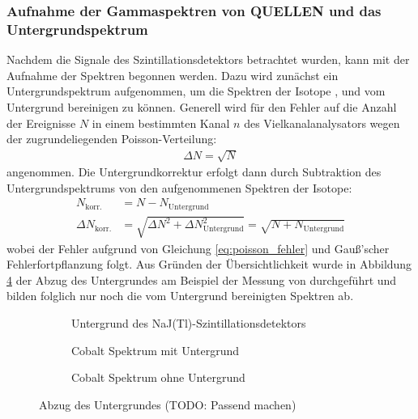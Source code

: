 \documentclass[11pt, a4paper]{article}
\numberwithin{equation}{section}
\begin{document}
\subsubsection{Aufnahme der Gammaspektren von QUELLEN und das Untergrundspektrum}
Nachdem die Signale des Szintillationsdetektors betrachtet wurden, kann mit der Aufnahme der Spektren begonnen werden.
Dazu wird zunächst ein Untergrundspektrum aufgenommen, um die Spektren der Isotope ,  und  vom Untergrund bereinigen zu können.
Generell wird für den Fehler auf die Anzahl der Ereignisse $N$ in einem bestimmten Kanal $n$ des Vielkanalanalysators wegen der zugrundeliegenden Poisson-Verteilung:
\begin{align}
\label{eq:poisson_fehler}
\Delta N = \sqrt{N}
\end{align}
angenommen.
Die Untergrundkorrektur erfolgt dann durch Subtraktion des Untergrundspektrums von den aufgenommenen Spektren der Isotope:
\begin{align}
	\label{eq:untergrundkorr_fehler}
	N_\mathrm{korr.} &= N - N_\mathrm{Untergrund}  \nonumber\\
	\Delta N_\mathrm{korr.} &= \sqrt{\Delta N^2 + \Delta N_\mathrm{Untergrund}^2} = \sqrt{N + N_\mathrm{Untergrund}}
\end{align}
wobei der Fehler aufgrund von Gleichung \ref{eq:poisson_fehler} und Gauß'scher Fehlerfortpflanzung folgt.
Aus Gründen der Übersichtlichkeit wurde in Abbildung \ref{fig:abzug_untergrund} der Abzug des Untergrundes am Beispiel der Messung von  durchgeführt und bilden folglich nur noch die vom Untergrund bereinigten Spektren ab.
\begin{figure}[hp]
	\centering
	\begin{subfigure}[b]{0.7\textwidth}
		\resizebox{!}{0.3\textheight}{
		
		}
		\caption{Untergrund des NaJ(Tl)-Szintillationsdetektors}
		\label{fig:untergrund_szinti}
	\end{subfigure}
	
	\begin{subfigure}[b]{0.7\textwidth}
		\resizebox{!}{0.3\textheight}{
		
		}
		\caption{Cobalt Spektrum mit Untergrund}
		\label{fig:cobalt_mit_untergrund}
	\end{subfigure}
	
	\begin{subfigure}[b]{0.7\textwidth}
		\resizebox{!}{0.3\textheight}{
		
		}
		\caption{Cobalt Spektrum ohne Untergrund}
		\label{fig:cobalt_ohne_untergrund}
	\end{subfigure}
	\caption{Abzug des Untergrundes (TODO: Passend machen)}
	\label{fig:abzug_untergrund}
\end{figure}
\end{document}
